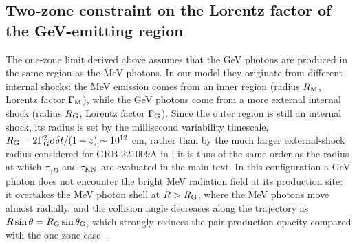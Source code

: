 \documentclass[prd,twocolumn,amsmath,amssymb,aps,linenumbers]{revtex4-2} %
\begin{document}
\subsection{Two-zone constraint on the Lorentz factor of the GeV-emitting region}
\label{sec:twozone}
The one-zone limit derived above assumes that the GeV photons are produced in the same region as the MeV photons. In our model they originate from different internal shocks: the MeV emission comes from an inner region (radius $R_{\rm M}$, Lorentz factor $\Gamma_{\rm M}$), while the GeV photons come from a more external internal shock (radius $R_{\rm G}$, Lorentz factor $\Gamma_{\rm G}$). Since the outer region is still an internal shock, its radius is set by the millisecond variability timescale, $R_{\rm G}=2\Gamma_{\rm G}^{2}c\,\delta t/(1+z)\sim10^{12}$ cm, rather than by the much larger external-shock radius considered for GRB 221009A in \cite{2023ApJ...956L..38G}; it is thus of the same order as the radius at which $\tau_{\gamma D}$ and $\tau_{\rm KN}$ are evaluated in the main text. In this configuration a GeV photon does not encounter the bright MeV radiation field at its production site: it overtakes the MeV photon shell at $R>R_{\rm G}$, where the MeV photons move almost radially, and the collision angle decreases along the trajectory as $R\sin\theta=R_{\rm G}\sin\theta_{\rm G}$, which strongly reduces the pair-production opacity compared with the one-zone case~\citep{2011ApJ...726L...2Z,2023ApJ...956L..38G}.
\end{document}

